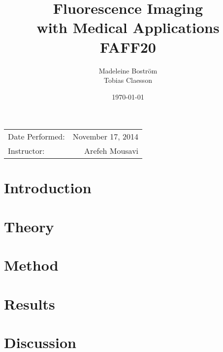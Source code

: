 \documentclass{article}
\title{Fluorescence Imaging \\ with Medical Applications \\ FAFF20}
\author{Madeleine Bostr\"{o}m \\ Tobias Claesson}
\date{\today}
\begin{document}
\maketitle

\begin{center}
\begin{tabular}{l r}
Date Performed: & November 17, 2014 \\ 
Instructor: & Arefeh Mousavi 
\end{tabular}
\end{center}

\clearpage


\section{Introduction}


\section{Theory}


\section{Method}


\section{Results}


\section{Discussion}





%

\end{document}
